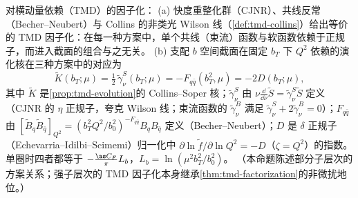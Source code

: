 \begin{proposition}\label{prop:scet-rapidity-rg}
对横动量依赖（TMD）的因子化：
(a) 快度重整化群（CJNR）、共线反常（Becher--Neubert）与 Collins 的非类光 Wilson 线（\cref{def:tmd-collins}）给出等价的 TMD 因子化\cite{Collins:2017oxh}：在每一种方案中，单个共线（束流）函数与软函数依赖于正规子，而进入截面的组合与之无关。
(b) 支配 $b$ 空间截面在固定 $b_T$ 下 $Q^2$ 依赖的演化核在三种方案中的对应为
\begin{equation}\label{eq:scet-kernels}
\tilde K(b_T;\mu)=\tfrac12\,\tilde\gamma_\nu^S(b_T;\mu)=-F_{q\bar q}(b_T^2,\mu)=-2D(b_T;\mu),
\end{equation}
其中 $\tilde K$ 是\cref{prop:tmd-evolution}的 Collins--Soper 核；$\tilde\gamma_\nu^S$ 由 $\nu\frac{\dd}{\dd\nu}\tilde S=\tilde\gamma^S_\nu\tilde S$ 定义（CJNR 的 $\eta$ 正规子，夸克 Wilson 线；束流函数的 $\tilde\gamma^B_\nu$ 满足 $\tilde\gamma^S_\nu+2\tilde\gamma^B_\nu=0$\cite[式~(5.38)]{ChiuEtAl2012b}）；$F_{q\bar q}$ 由 $[\tilde B_{q}\tilde B_{\bar q}]_{Q^2}=(b_T^2Q^2/b_0^2)^{-F_{q\bar q}}B_qB_{\bar q}$ 定义（Becher--Neubert\cite[式~(15)]{BecherNeubert2011}）；$D$ 是 $\delta$ 正规子（Echevarria--Idilbi--Scimemi）归一化中 $\partial\ln\tilde f/\partial\ln Q^2=-D$（$\zeta=Q^2$）的指数\cite[式~(5.4)]{EchevarriaIdilbiScimemi2012}。单圈时四者都等于 $-\frac{\as C_F}{\pi}L_b$，$L_b=\ln(\mu^2b_T^2/b_0^2)$。
（本命题陈述部分子层次的方案关系；强子层次的 TMD 因子化本身继承\cref{thm:tmd-factorization}的非微扰地位。）
\end{proposition}

